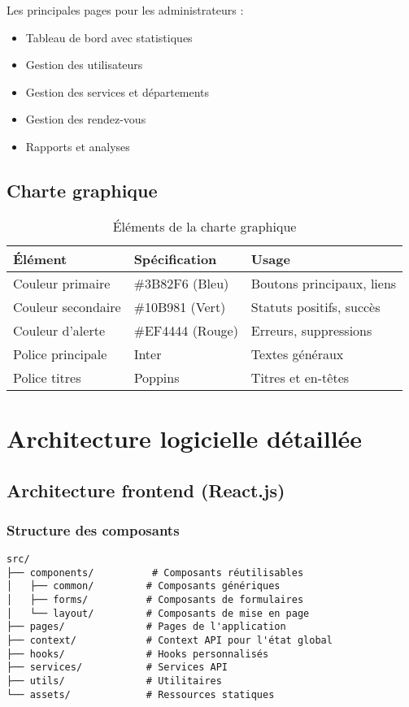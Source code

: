 Les principales pages pour les administrateurs :
\begin{itemize}
    \item Tableau de bord avec statistiques
    \item Gestion des utilisateurs
    \item Gestion des services et départements
    \item Gestion des rendez-vous
    \item Rapports et analyses
\end{itemize}

\subsection{Charte graphique}

\begin{table}[h]
\centering
\begin{tabular}{|l|l|l|}
\hline
\textbf{Élément} & \textbf{Spécification} & \textbf{Usage} \\
\hline
Couleur primaire & \#3B82F6 (Bleu) & Boutons principaux, liens \\
\hline
Couleur secondaire & \#10B981 (Vert) & Statuts positifs, succès \\
\hline
Couleur d'alerte & \#EF4444 (Rouge) & Erreurs, suppressions \\
\hline
Police principale & Inter & Textes généraux \\
\hline
Police titres & Poppins & Titres et en-têtes \\
\hline
\end{tabular}
\caption{Éléments de la charte graphique}
\label{tab:style_guide}
\end{table}

\section{Architecture logicielle détaillée}

\subsection{Architecture frontend (React.js)}

\subsubsection{Structure des composants}

\begin{lstlisting}[caption=Structure des dossiers frontend]
src/
├── components/          # Composants réutilisables
│   ├── common/         # Composants génériques
│   ├── forms/          # Composants de formulaires
│   └── layout/         # Composants de mise en page
├── pages/              # Pages de l'application
├── context/            # Context API pour l'état global
├── hooks/              # Hooks personnalisés
├── services/           # Services API
├── utils/              # Utilitaires
└── assets/             # Ressources statiques
\end{lstlisting}

